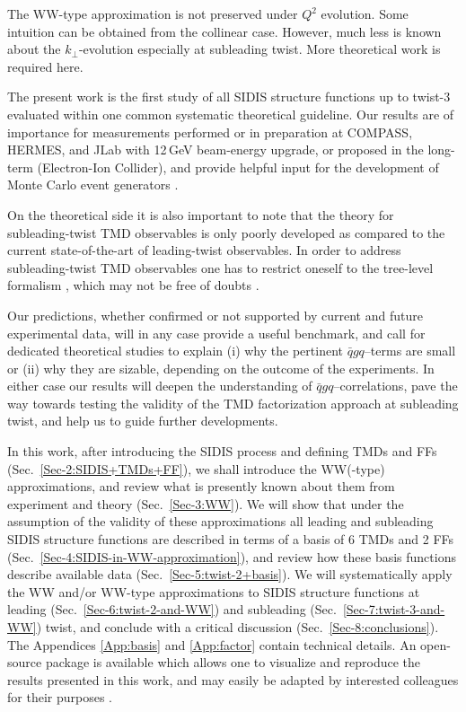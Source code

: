 \documentclass[a4paper,11pt]{article}
\newcommand{\blue}[1]{{\color{blue} #1}}
\newcommand{\orange}[1]{{\color{orange}#1}}
\newcommand{\ak}[1]{\orange{#1}}
\newcommand{\ps}[1]{\blue{#1}}
\begin{document}
\ps{The WW-type approximation is not preserved under $Q^2$ evolution.
Some intuition can be obtained from the collinear case. However,
much less is known about the $k_\perp$-evolution especially at 
subleading twist. More theoretical work is required here.}

The present work is the first 
\ps{study of all SIDIS structure functions up to twist-3 evaluated within one
common systematic theoretical guideline.}
Our results are of importance for measurements
performed or in preparation at COMPASS, HERMES, and JLab with
12$\,$GeV beam-energy upgrade, or proposed in the long-term
(Electron-Ion Collider), and provide helpful input for the
development of Monte Carlo event generators \cite{Avakian:2015vha}.

On the theoretical side it is also important to note that the
theory for subleading-twist TMD observables is only poorly developed
as compared to the current state-of-the-art of leading-twist observables.
In order to address subleading-twist TMD observables one has
to restrict oneself to the tree-level formalism
\cite{Kotzinian:1994dv,Mulders:1995dh,Boer:1997nt,Goeke:2005hb,
Bacchetta:2006tn}, which may not be free of doubts
\cite{Metz:2004je,Gamberg:2006ru}.

Our predictions, whether confirmed or not supported by current and
future experimental data, will in any case provide a useful benchmark,
and call for dedicated theoretical studies to explain (i) why the
pertinent $\bar{q}gq$--terms are small or (ii) why they are sizable,
depending on the outcome of the experiments.
In either case our results will deepen the understanding of
$\bar{q}gq$--correlations, pave the
way towards testing the validity of the TMD factorization approach
at subleading twist, and help us to guide further developments.

In this work, after introducing the SIDIS process and defining TMDs and
FFs (Sec.~\ref{Sec-2:SIDIS+TMDs+FF}), we shall introduce the WW(-type)
approximations, and review what is presently known about them
from experiment and theory (Sec.~\ref{Sec-3:WW}).
We will show that under the assumption of the validity of these approximations
all leading and subleading SIDIS structure functions are described in terms of
a basis of 6 TMDs and 2 FFs (Sec.~\ref{Sec-4:SIDIS-in-WW-approximation}),
and review how these basis functions describe available data
(Sec.~\ref{Sec-5:twist-2+basis}).
We will systematically apply the WW and/or WW-type approximations
to SIDIS structure functions at leading (Sec.~\ref{Sec-6:twist-2-and-WW})
and subleading (Sec.~\ref{Sec-7:twist-3-and-WW}) twist, and
conclude with a critical discussion (Sec.~\ref{Sec-8:conclusions}).
The Appendices \ref{App:basis} and \ref{App:factor} contain
technical details.
\ps{	An open-source package is available which allows one to visualize 
	and reproduce the results presented in this work, and may easily 
	be adapted by \ak{interested colleagues for their purposes}
	\cite{Mathematica}.
}
\end{document}
